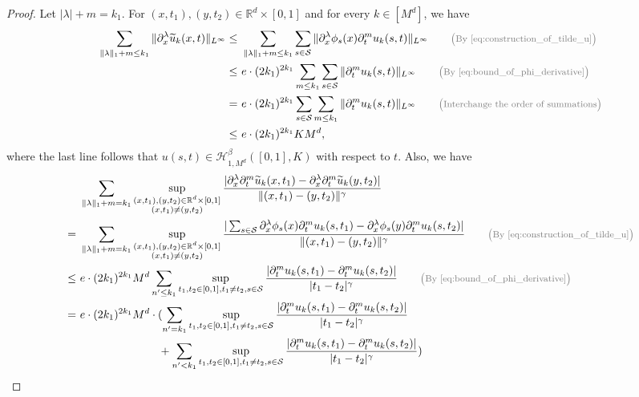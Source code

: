 \documentclass[12pt]{article}
\numberwithin{equation}{section}
\let\tilde\widetilde
\newcommand{\wt}{\widetilde}
\renewcommand{\tilde}{\wt}
\def\R{\mathbb{R}}
\theoremstyle{theoremstyle}
\numberwithin{equation}{section}
\numberwithin{theorem}{section}
\numberwithin{proposition}{section}
\numberwithin{definition}{section}
\numberwithin{lemma}{section}
\numberwithin{assumption}{section}
\numberwithin{remark}{section}
\newcommand*{\annot}[1]{\tag*{\footnotesize{\textcolor{black!50}{\big(#1\big)}}}}
\begin{document}
\begin{proof}
Let $|\lambda|+m=k_1$. 
For $(x,t_1),(y,t_2)\in\R^d\times[0,1]$ and for every $k\in [M^d]$, we have
\begin{align}
    \sum_{\|\lambda\|_1+m\leq k_1} \|\partial_x^\lambda\tilde{u}_k(x,t)\|_{L^\infty} 
    \leq & ~ 
    \sum_{\|\lambda\|_1+m\leq k_1}\sum_{s\in \mathcal{S}} \|\partial_x^\lambda\phi_s(x)\partial^{m}_t u_k(s,t)\|_{L^\infty} 
    \annot{By \eqref{eq:construction_of_tilde_u}}\\
    \leq & ~
    e\cdot(2k_1)^{2k_1} \sum_{m\leq k_1}\sum_{s\in \mathcal{S}} \|\partial^{m}_t u_k(s,t)\|_{L^\infty} 
    \annot{By \eqref{eq:bound_of_phi_derivative}}\\
    = & ~
    e\cdot(2k_1)^{2k_1} \sum_{s\in \mathcal{S}} \sum_{m\leq k_1}\|\partial^{m}_t u_k(s,t)\|_{L^\infty} \annot{Interchange the order of summations}\\
    \leq & ~
    \label{eq:bound_on_derivative_part}
    e\cdot(2k_1)^{2k_1} KM^d,
\end{align}
where the last line follows that $u(s,t)\in\mathcal{H}^\beta_{1,M^d}([0,1],K)$ with respect to $t$.
Also, we have
\begin{align}
    & ~ \sum_{\|\lambda\|_1+m =  k_1}\sup_{\substack{{(x,t_1),(y,t_2)\in\R^d\times[0,1]}\\(x,t_1)\neq(y,t_2)}} \frac{|\partial_x^\lambda\partial_t^m\tilde{u}_k(x,t_1)-\partial_x^\lambda\partial_t^m\tilde{u}_k(y,t_2)|}{\|(x,t_1)-(y,t_2)\|^\gamma} \notag\\
    = & ~ 
    \sum_{\|\lambda\|_1+m =  k_1}\sup_{\substack{{(x,t_1),(y,t_2)\in\R^d\times[0,1]}\\(x,t_1)\neq(y,t_2)}} \frac{|\sum_{s\in \mathcal{S}}\partial^\lambda_x\phi_s(x)\partial^m_t u_k(s,t_1)-\partial^\lambda_x \phi_s(y)\partial^m_t u_k(s,t_2)|}{\|(x,t_1)-(y,t_2)\|^\gamma} \annot{By \eqref{eq:construction_of_tilde_u}}\\
    \leq & ~
    e\cdot(2k_1)^{2k_1} M^d\sum_{n'\leq k_1}\sup_{t_1,t_2\in[0,1],t_1\neq t_2,s\in \mathcal{S}}\frac{|\partial^m_t u_k(s,t_1)-\partial^m_t u_k(s,t_2)|}{|t_1-t_2|^\gamma} \annot{By \eqref{eq:bound_of_phi_derivative}}\\
    = & ~
    e\cdot(2k_1)^{2k_1} M^d \cdot (\sum_{n'= k_1}\sup_{t_1,t_2\in[0,1],t_1\neq t_2,s\in \mathcal{S}}\frac{|\partial^m_t u_k(s,t_1)-\partial^m_t u_k(s,t_2)|}{|t_1-t_2|^\gamma} \notag\\
    & ~ \hspace{7em}
    +\sum_{n'< k_1}\sup_{t_1,t_2\in[0,1],t_1\neq t_2,s\in \mathcal{S}}\frac{|\partial^m_t u_k(s,t_1)-\partial^m_t u_k(s,t_2)|}{|t_1-t_2|^\gamma}) \notag\\

\end{align}
\end{proof}
\end{document}
